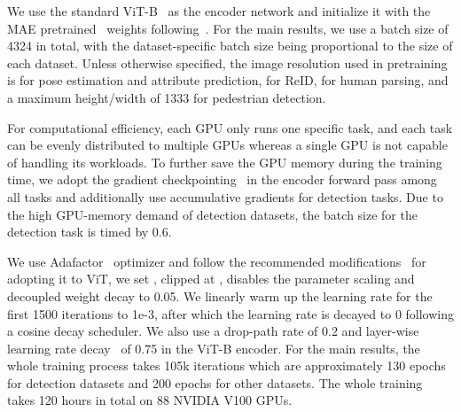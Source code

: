 \documentclass[10pt,twocolumn,letterpaper]{article}
\begin{document}
We use the standard ViT-B~\cite{dosovitskiy2020image} as the encoder network and initialize it with the MAE pretrained~\cite{he2022masked} weights following~\cite{xu2022vitpose,li2022exploring}. For the main results, we use a batch size of 4324 in total, with the dataset-specific batch size being proportional to the size of each dataset. Unless otherwise specified, the image resolution used in pretraining is  for pose estimation and attribute prediction,  for ReID,  for human parsing, and a maximum height/width of 1333 for pedestrian detection. 

For computational efficiency, each GPU only runs one specific task, and each task can be evenly distributed to multiple GPUs whereas a single GPU is not capable of handling its workloads.
To further save the GPU memory during the training time, we adopt the gradient checkpointing~\cite{FairScale2021}
in the encoder forward pass among all tasks and additionally use accumulative gradients for detection tasks. Due to the high GPU-memory demand of detection datasets, the batch size for the detection task is timed by 0.6. 

We use Adafactor~\cite{shazeer2018adafactor} optimizer and follow the recommended modifications~\cite{zhai2022scaling} for adopting it to ViT, we set ,  clipped at , disables the parameter scaling and decoupled weight decay to 0.05. We linearly warm up the learning rate for the first 1500 iterations to 1e-3, after which the learning rate is decayed to 0 following a cosine decay scheduler.
We also use a drop-path rate of 0.2 and layer-wise learning rate decay~\cite{li2022exploring,xu2022vitpose} of 0.75 in the ViT-B encoder.
For the main results, the whole training process takes 105k iterations which are approximately 130 epochs for detection datasets and 200 epochs for other datasets. The whole training takes 120 hours in total on 88 NVIDIA V100 GPUs.
\end{document}
